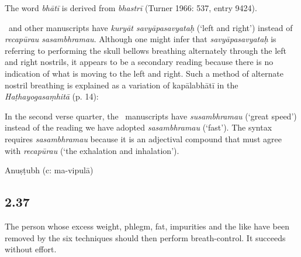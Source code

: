 \begin{ekdosis}
\begin{testimonia}[hp02_036]
\end{testimonia}

\begin{philcomm}[hp02_036]
The word \emph{bhātī} is derived from \emph{bhastrī} (Turner 1966: 537, entry 9424).\lb

\etaTwo\ and other manuscripts have \emph{kuryāt savyāpasavyataḥ} (`left and right’) instead of \emph{recapūrau sasambhramau}. Although one might infer that \emph{savyāpasavyataḥ} is referring to performing the skull bellows breathing alternately through the left and right nostrils, it appears to be a secondary reading because there is no indication of what is moving to the left and right. Such a method of alternate nostril breathing is explained as a variation of kapālabhātī in the \emph{Haṭhayogasaṃhitā} (p. 14):   %
\begin{versinnote} 
\end{versinnote}

In the second verse quarter, the \textalpha\ manuscripts have \emph{susambhramau} (`great speed') instead of the reading we have adopted \emph{sasambhramau} (`fast'). The syntax requires \emph{sasambhramau} because it is an adjectival compound that must agree with \emph{recapūrau} (`the exhalation and inhalation'). %
\end{philcomm}

\begin{metre}[hp02_036]
Anuṣṭubh (c: ma-vipulā)
\end{metre}

\subsection*{2.37}
\begin{translation}[hp02_037]
The person whose excess weight, phlegm, fat, impurities and the like have been removed by the six techniques should then perform breath-control. It succeeds without effort.
\end{translation}



\end{ekdosis}
